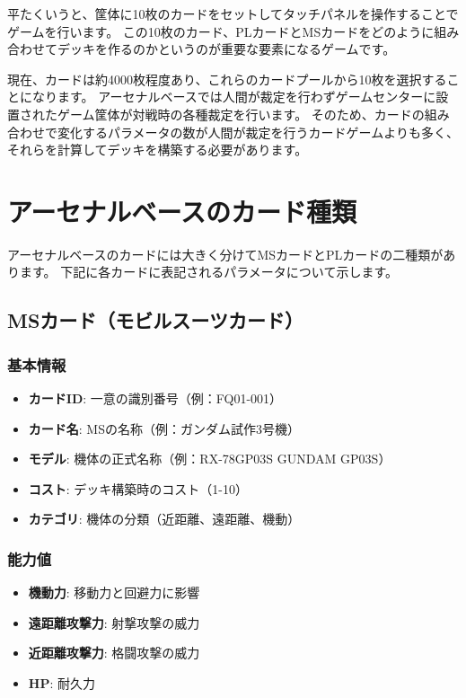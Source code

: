 平たくいうと、筐体に10枚のカードをセットしてタッチパネルを操作することでゲームを行います。
この10枚のカード、PLカードとMSカードをどのように組み合わせてデッキを作るのかというのが重要な要素になるゲームです。

現在、カードは約4000枚程度あり、これらのカードプールから10枚を選択することになります。
アーセナルベースでは人間が裁定を行わずゲームセンターに設置されたゲーム筐体が対戦時の各種裁定を行います。
そのため、カードの組み合わせで変化するパラメータの数が人間が裁定を行うカードゲームよりも多く、それらを計算してデッキを構築する必要があります。

\section*{アーセナルベースのカード種類}

アーセナルベースのカードには大きく分けてMSカードとPLカードの二種類があります。
下記に各カードに表記されるパラメータについて示します。


\subsection*{MSカード（モビルスーツカード）}
\subsubsection*{基本情報}
\begin{itemize}
    \item \textbf{カードID}: 一意の識別番号（例：FQ01-001）
    \item \textbf{カード名}: MSの名称（例：ガンダム試作3号機）
    \item \textbf{モデル}: 機体の正式名称（例：RX-78GP03S GUNDAM GP03S）
    \item \textbf{コスト}: デッキ構築時のコスト（1-10）
    \item \textbf{カテゴリ}: 機体の分類（近距離、遠距離、機動）
\end{itemize}

\subsubsection*{能力値}
\begin{itemize}
    \item \textbf{機動力}: 移動力と回避力に影響
    \item \textbf{遠距離攻撃力}: 射撃攻撃の威力
    \item \textbf{近距離攻撃力}: 格闘攻撃の威力
    \item \textbf{HP}: 耐久力
\end{itemize}

